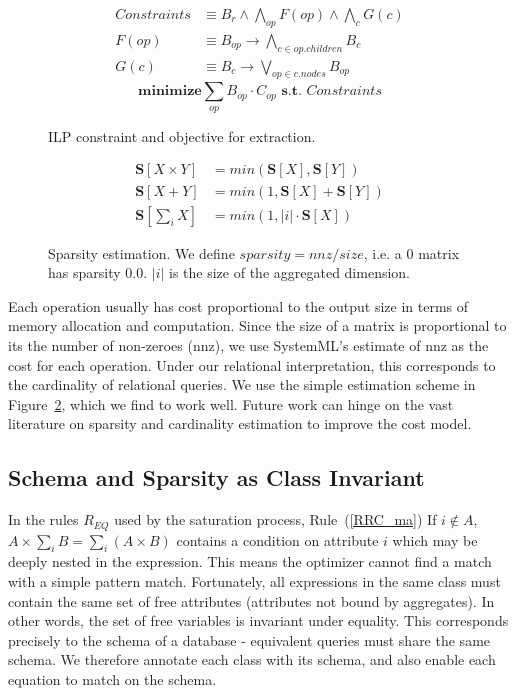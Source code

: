 \begin{figure}
{\small
    \begin{align*}
Constraints &\equiv B_r \wedge \bigwedge_{op} F(op) \wedge \bigwedge_c G(c)
\\ F(op) &\equiv B_{op} \rightarrow \bigwedge_{c \in op.children} B_c \\ G(c)
&\equiv B_c \rightarrow \bigvee_{op \in c.nodes} B_{op}
\end{align*}
\[\textbf{minimize} \sum_{op} B_{op} \cdot C_{op} \textbf{ s.t. } Constraints\]
    \caption{ILP constraint and objective for extraction. }
    \vspace{-10pt}
    \label{ilp}
}%
\end{figure}
\begin{figure}
\begin{align*}
    \textbf{S}[X\times Y] &= min(\textbf{S}[X], \textbf{S}[Y]) \\ \textbf{S}[X+Y] &=
    min(1, \textbf{S}[X]+\textbf{S}[Y]) \\ \textbf{S}[\sum_i X] &= min(1, |i|
    \cdot \textbf{S}[X])
\end{align*}
    \caption[Sparsity estimation]{Sparsity estimation. We define $sparsity = nnz
      / size$, i.e. a 0 matrix has sparsity $0.0$\protect\footnotemark. $|i|$ is
      the size of the aggregated dimension. }
    \label{fig:cost}
\end{figure}

Each operation usually has cost proportional to the output size in terms of
memory allocation and computation. Since the size of a matrix is proportional to
its the number of non-zeroes (nnz), we use SystemML's estimate of nnz as the
cost for each operation. Under our relational interpretation, this corresponds
to the cardinality of relational queries. We use the simple estimation scheme in
Figure~\ref{fig:cost}, which we find to work well.  Future work can hinge on the
vast literature on sparsity and cardinality estimation to improve the cost
model.

\subsection{Schema and Sparsity as Class Invariant}
In the rules $R_{EQ}$ used by the saturation process, Rule~(\ref{RRC_ma}) If $i
\not\in A$, $A \times \sum_i B = \sum_i (A \times B)$ contains a condition on attribute
$i$ which may be deeply nested in the expression. This means the optimizer
cannot find a match with a simple pattern match. Fortunately, all expressions in
the same class must contain the same set of free attributes (attributes not
bound by aggregates). In other words, the set of free variables is invariant
under equality. This corresponds precisely to the schema of a database -
equivalent queries must share the same schema. We therefore annotate each class
with its schema, and also enable each equation to match on the schema.

